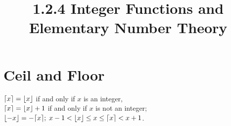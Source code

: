 \documentclass{article}
\title{1.2.4 Integer Functions and Elementary Number Theory}
\DeclarePairedDelimiter\ceil{\lceil}{\rceil}
\DeclarePairedDelimiter\floor{\lfloor}{\rfloor}
\begin{document}
	\maketitle
	\section*{Ceil and Floor}
	$\ceil*{x} = \floor*{x}$ \hspace{0.5cm} if and only if $x$ is an integer,\\
	$\ceil*{x} = \floor*{x} + 1$ \hspace{0.5cm}  if and only if $x$ is not an integer;\\
	$\floor*{-x} = -\ceil*{x};$  \hspace{0.5cm} $x - 1 < \floor*{x} \leq x \leq \ceil*{x} < x+1$.
\end{document}

